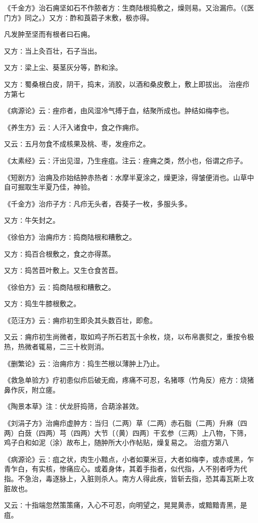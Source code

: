 \documentclass[a4paper,12pt,UTF8,twoside]{ctexbook}
\begin{document}
《千金方》治石痈坚如石不作脓者方∶生商陆根捣敷之，燥则易。又治漏疖。（《医门方》同之。）又方∶酢和莨菪子末敷，极亦得。

凡发肿至坚而有根者曰石痈。

又方∶当上灸百壮，石子当出。

又方∶梁上尘、葵茎灰分等，酢和涂。

又方∶蜀桑根白皮，阴干，捣末，消胶，以酒和桑皮敷上，敷上即拔出。
治痤疖方第七

《病源论》云∶痤疖者，由风湿冷气搏于血，结聚所成也。肿结如梅李也。

《养生方》云∶人汗入诸食中，食之作痈疖。

又云∶五月勿食不成核果及桃、枣，发痤疖之。

《太素经》云∶汗出见湿，乃生痤疽。注云∶痤痈之类，然小也，俗谓之疖子。

《短剧方》治痈及疖始结肿赤热者∶水摩半夏涂之，燥更涂，得皱便消也。山草中自可掘取生半夏乃佳，神验。

《千金方》治疖子方∶凡疖无头者，吞葵子一枚，多服头多。

又方∶牛矢封之。

《徐伯方》治痈疖方∶捣商陆根和糟敷之。

又方∶捣百合根敷之，食之亦得蒸。

又方∶捣苦苣叶敷上。又生仓食苦苣。

《徐伯方》云∶捣商陆根和糟敷之。

又方∶捣生牛膝根敷之。

《范汪方》云∶痈疖初生即灸其头数百壮，即愈。

又云∶痈疖初生尚微者，取如鸡子所石若瓦十余枚，烧，以布帛裹熨之，重按令极热，热微者辄易，二三十枚则消。

《删繁论》云∶治痈疖方∶捣生苎根以薄肿上乃止。

《救急单验方》疗初患似疖后破无痂，疼痛不可忍，名猪啄（竹角反）疮方∶烧猪鼻作灰，附立瘥。

《陶景本草》注∶伏龙肝捣筛，合葫涂甚效。

《刘涓子方》治痈疖虚肿方∶当归（二两）草（二两）赤石脂（二两）升麻（四两）白蔹（四两）芎（四两）大节〔（黄）四两〕干玄参（三两）上八物，下筛，鸡子白和如泥（涂）故布上，随肿所大小作帖贴，燥复易之。
治疽方第八

《病源论》云∶疽之状，肉生小黯点，小者如粟米豆，大者如梅李，或赤或黑，乍青乍白，有实核，惨痛应心。或着身体，其着手指者，似代指，人不别者呼为代指。不急治，毒逐脉上，入脏则杀人。南方人得此疾，皆斩去指，恐其毒瓦斯上攻脏故也。

又云∶十指端忽然策策痛，入心不可忍，向明望之，晃晃黄赤，或黯黯青黑，是疽。
\end{document}
